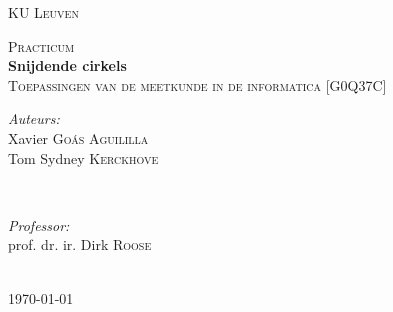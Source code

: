 \begin{titlepage}
\thispagestyle{empty}
\newcommand{\HRule}{\rule{\linewidth}{0.5mm}}
\center
\textsc{\LARGE KU Leuven}\\[1.5cm]
\vfill

\textsc{\large Practicum}\\[0.5cm]
{ \Huge \bfseries Snijdende cirkels}\\[0.4cm]
\textsc{\large Toepassingen van de meetkunde in de informatica [G0Q37C]}\\[0.5cm]
\vfill

\begin{minipage}{0.4\textwidth}
\begin{flushleft} \large
\emph{Auteurs:}\\
Xavier \textsc{Go\'as Aguililla}\\
Tom Sydney \textsc{Kerckhove}
\end{flushleft}
\end{minipage}
~
\begin{minipage}{0.4\textwidth}
\begin{flushright} \large
\emph{Professor:} \\
prof. dr. ir. Dirk \textsc{Roose}\\
\end{flushright}
\end{minipage}\\[4cm]

{\large \today}\\[3cm]
\vfill

\end{titlepage}